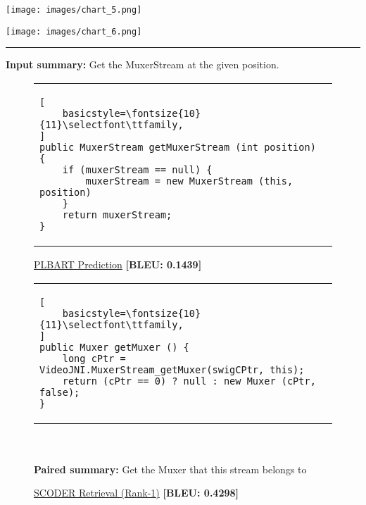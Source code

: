 \documentclass[11pt]{article}
\begin{document}
\begin{figure*}[!htb]
  \texttt{[image: images/chart\_5.png]}
  \caption{\#Code per target  length.}\label{fig:num_examples_vs_len}
\endminipage
\hfill
{}\texttt{[image: images/chart\_6.png]}
  \caption{BLEU vs target len. (Java)}\label{fig:bleu_vs_len_java}
\endminipage
\vspace{-30pt}
\end{figure*}








\clearpage


\begin{figure*}[t]
\centering
\rule{\linewidth}{0.9pt}
{\Large{\bf Input summary:} Get the MuxerStream at the given position.}
\\ \vspace{5mm}
\begin{subfigure}{\textwidth}
\captionsetup{font=large}
\caption{\underline{PLBART Prediction} {\bf[BLEU: 0.1439]}}
\begin{tabular}{l}
\lstset{escapechar=@,style=CustomJava}
\begin{lstlisting}[
    basicstyle=\fontsize{10}{11}\selectfont\ttfamily,
]
public MuxerStream getMuxerStream (int position) {
    if (muxerStream == null) {
        muxerStream = new MuxerStream (this, position)
    }
    return muxerStream;
}
\end{lstlisting}
\end{tabular}
\end{subfigure}\vspace{5mm}
\begin{subfigure}{\textwidth}
\lstset{escapechar=@,style=CustomJava}
\captionsetup{font=large}
\caption{\underline{SCODER Retrieval (Rank-1)} {\bf[BLEU: 0.4298]}}
\begin{tabular}{l}
\lstset{escapechar=@,style=CustomJava}
\begin{lstlisting}[
    basicstyle=\fontsize{10}{11}\selectfont\ttfamily,
]
public Muxer getMuxer () {
    long cPtr = VideoJNI.MuxerStream_getMuxer(swigCPtr, this);
    return (cPtr == 0) ? null : new Muxer (cPtr, false);
}
\end{lstlisting}
\end{tabular}
\\ \\ 
{{\bf Paired summary:} Get the Muxer that this stream belongs to} 
\\ \vspace{5mm}

\end{subfigure}
\end{figure*}
\end{document}

